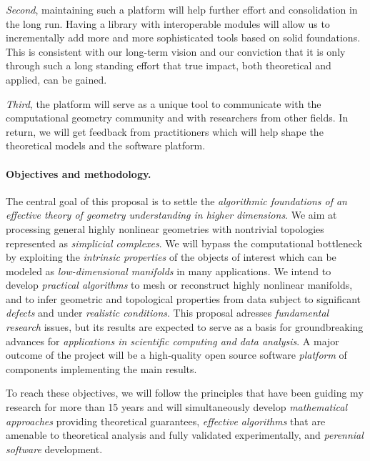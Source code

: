{\em Second}, maintaining such a platform will help further effort and consolidation in the long run.  Having a library with interoperable modules will allow us to incrementally add more and more sophisticated tools based on solid foundations.  This is consistent with our long-term vision and our conviction that it is only through such a long standing effort that true impact, both theoretical and applied, can be gained.

{\em Third}, the platform will serve as a unique tool to communicate with the computational geometry community and with researchers from other fields. 
 In return, we will get feedback from practitioners which will help shape the theoretical models and the software platform.

\paragraph{Objectives and methodology.}
The central goal of this proposal is to settle the {\em algorithmic foundations of an effective theory of geometry understanding in higher dimensions}.  We aim at processing general highly nonlinear geometries with nontrivial topologies represented as {\em simplicial complexes}. We will bypass the computational bottleneck by exploiting the {\em intrinsic properties} of the objects of interest which can be modeled as {\em low-dimensional manifolds} in many applications. We intend to develop {\em practical algorithms} to mesh or reconstruct highly nonlinear manifolds, and to infer geometric and topological properties from data subject to significant {\em defects} and under {\em realistic conditions}. This proposal adresses {\em fundamental
  research} issues, but its results are expected to serve as a basis
for groundbreaking advances for {\em applications in scientific computing
and data analysis}.  A major outcome of the project will be a
high-quality open source software {\em platform} of components
implementing the main results.

To reach these objectives, we will follow the principles that have been
guiding my research for more than 15 years and will simultaneously
develop {\em mathematical approaches} providing theoretical
guarantees, {\em effective algorithms} that are amenable to
theoretical analysis and fully validated experimentally, and {\em
  perennial software} development.


